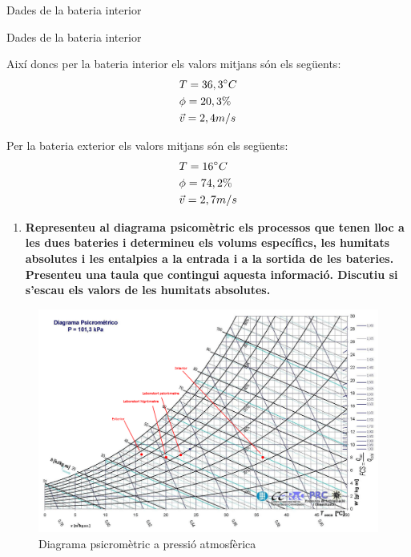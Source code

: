 \documentclass[a4paper]{article}
\newenvironment{questionenum}{%
	\setlist[enumerate]{resume}
	\restartlist{enumerate}
	\newcommand{\question}[1]{
		\begin{enumerate}
			\item\bfseries ##1
		\end{enumerate}
}}{%
}
\begin{document}
\begin{questionenum}
	\begin{table}[H]
		\begin{minipage}[t]{0.48\textwidth}
			\centering
			\caption{Dades de la bateria interior}
		\end{minipage}
		\begin{minipage}[t]{0.48\textwidth}
			\centering
			\caption{Dades de la bateria interior}
		\end{minipage}
	\end{table}

    Així doncs per la bateria interior els valors mitjans són els següents:
    \begin{align*}
        & T = 36,3 \degree C \\
        & \phi = 20,3 \% \\
        & \vec{v} = 2,4 m/s
    \end{align*}
    
    Per la bateria exterior els valors mitjans són els següents:
    \begin{align*}
        & T = 16 \degree C \\
        & \phi  = 74,2 \% \\
        & \vec{v} = 2,7 m/s
    \end{align*}

	\question{Representeu al diagrama psicomètric els processos que tenen lloc a les dues bateries i determineu els volums específics, les humitats absolutes i les entalpies a la entrada i a la sortida de les bateries. Presenteu una taula que contingui aquesta informació. Discutiu si s'escau els valors de les humitats absolutes.}
    
    \begin{figure}[H]
        \centering
        \includegraphics[width=\textwidth]{images/psychrometric}
        \caption{Diagrama psicromètric a pressió atmosfèrica}
    \end{figure}
	

\end{questionenum}
\end{document}
